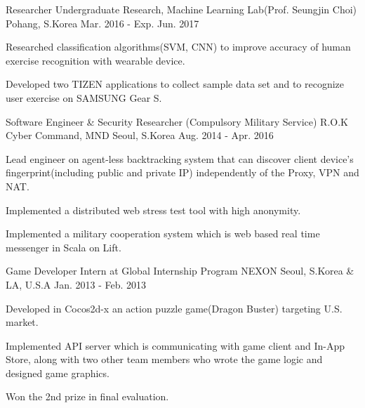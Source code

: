 \begin{cventries}
  \cventry
    {Researcher} %
    {Undergraduate Research, Machine Learning Lab(Prof. Seungjin Choi)} %
    {Pohang, S.Korea} %
    {Mar. 2016 - Exp. Jun. 2017} %
    {
      \begin{cvitems} %
        \item {Researched classification algorithms(SVM, CNN) to improve accuracy of human exercise recognition with wearable device.}
        \item {Developed two TIZEN applications to collect sample data set and to recognize user exercise on SAMSUNG Gear S.}
      \end{cvitems}
    }

  \cventry
    {Software Engineer \& Security Researcher (Compulsory Military Service)} %
    {R.O.K Cyber Command, MND} %
    {Seoul, S.Korea} %
    {Aug. 2014 - Apr. 2016} %
    {
      \begin{cvitems} %
        \item {Lead engineer on agent-less backtracking system that can discover client device's fingerprint(including public and private IP) independently of the Proxy, VPN and NAT.}
        \item {Implemented a distributed web stress test tool with high anonymity.}
        \item {Implemented a military cooperation system which is web based real time messenger in Scala on Lift.}
      \end{cvitems}
    }

  \cventry
    {Game Developer Intern at Global Internship Program} %
    {NEXON} %
    {Seoul, S.Korea \& LA, U.S.A} %
    {Jan. 2013 - Feb. 2013} %
    {
      \begin{cvitems} %
        \item {Developed in Cocos2d-x an action puzzle game(Dragon Buster) targeting U.S. market.}
        \item {Implemented API server which is communicating with game client and In-App Store, along with two other team members who wrote the game logic and designed game graphics.}
        \item {Won the 2nd prize in final evaluation.}
      \end{cvitems}
    }


\end{cventries}

